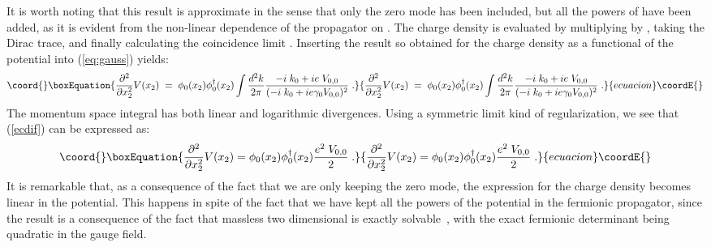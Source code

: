 \documentclass[a4paper,12pt]{article}
\begin{document}
{{It is worth noting that this result is approximate in the sense that
only the zero mode has been included, but all the powers of \coordHE{}
have been added, as it is evident from the non-linear dependence of
the propagator on \coordHE{}.  The charge density is evaluated by
multiplying by \coordHE{}, taking the Dirac trace, and finally
calculating the coincidence limit \coordHE{}. Inserting the result so
obtained for the charge density as a functional of the potential into
(\ref{eq:gauss}) yields:
\begin{equation}\coord{}\boxEquation{
   \label{ecdif}
\frac{\partial^2}{\partial x_2^2}V(x_2)\;=\; \phi_0(x_2)\phi^{\dagger}_0(x_2) \int \frac{d^2k}{2\pi}
\frac{-i\;k_0+ie\;V_{0,0}}{(-i\;k_0+ie \gamma_0 V_{0,0})^2}\;.
}{
   \frac{\partial^2}{\partial x_2^2}V(x_2)\;=\; \phi_0(x_2)\phi^{\dagger}_0(x_2) \int \frac{d^2k}{2\pi}
\frac{-i\;k_0+ie\;V_{0,0}}{(-i\;k_0+ie \gamma_0 V_{0,0})^2}\;.
}{ecuacion}\coordE{}\end{equation}
The momentum space integral has both linear and logarithmic
divergences. Using a symmetric limit kind of regularization, we see
that (\ref{ecdif}) can be expressed as:
\begin{equation}\coord{}\boxEquation{
   \label{ecdif1}
\frac{\partial^2}{\partial x_2^2}V(x_2) =
\phi_0(x_2)\phi^{\dagger}_0(x_2)\frac{e^2\;V_{0,0}}{2}\;.
}{
   \frac{\partial^2}{\partial x_2^2}V(x_2) =
\phi_0(x_2)\phi^{\dagger}_0(x_2)\frac{e^2\;V_{0,0}}{2}\;.
}{ecuacion}\coordE{}\end{equation}
It is remarkable that, as a consequence of the fact that we are only
keeping the zero mode, the expression for the charge density becomes
linear in the potential. This happens in spite of the fact that we
have kept all the powers of the potential in the fermionic propagator,
since the result is a consequence of the fact that massless two
dimensional \coordHE{} is exactly solvable~\cite{sch}, with the exact
fermionic determinant being quadratic in the gauge field.

}}
\end{document}
